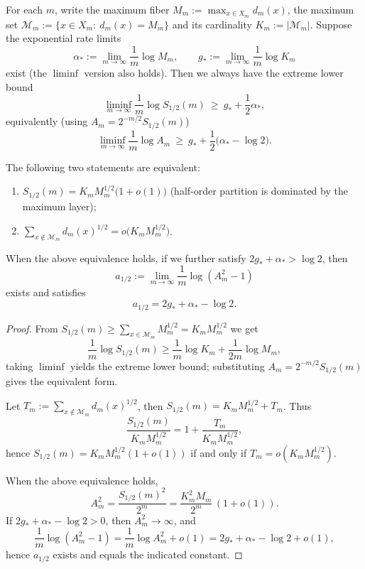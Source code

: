 \begin{theorem}\label{thm:pom-half-order-pressure-extreme-lower-bound-sqrt-freezing}
For each \(m\), write the maximum fiber \(M_m:=\max_{x\in X_m}d_m(x)\), the maximum set
\(
\mathcal{M}_m:=\{x\in X_m:\ d_m(x)=M_m\}
\)
and its cardinality \(K_m:=|\mathcal{M}_m|\).
Suppose the exponential rate limits
\[
\alpha_*:=\lim_{m\to\infty}\frac{1}{m}\log M_m,\qquad
g_*:=\lim_{m\to\infty}\frac{1}{m}\log K_m
\]
exist (the \(\liminf\) version also holds).
Then we always have the extreme lower bound
\[
\liminf_{m\to\infty}\frac{1}{m}\log S_{1/2}(m)\ \ge\ g_*+\frac{1}{2}\alpha_*,
\]
equivalently (using \(A_m=2^{-m/2}S_{1/2}(m)\))
\[
\liminf_{m\to\infty}\frac{1}{m}\log A_m\ \ge\ g_*+\frac{1}{2}\bigl(\alpha_*-\log 2\bigr).
\]
\par
The following two statements are equivalent:
\begin{enumerate}
  \item \(\displaystyle S_{1/2}(m)=K_m M_m^{1/2}\bigl(1+o(1)\bigr)\) (half-order partition is dominated by the maximum layer);
  \item \(\displaystyle \sum_{x\notin\mathcal{M}_m} d_m(x)^{1/2}=o\bigl(K_m M_m^{1/2}\bigr)\).
\end{enumerate}
When the above equivalence holds, if we further satisfy \(2g_*+\alpha_*>\log 2\), then
\[
a_{1/2}:=\lim_{m\to\infty}\frac{1}{m}\log(A_m^2-1)
\]
exists and satisfies
\[
a_{1/2}=2g_*+\alpha_*-\log 2.
\]
\end{theorem}
\begin{proof}
From \(S_{1/2}(m)\ge \sum_{x\in\mathcal{M}_m} M_m^{1/2}=K_m M_m^{1/2}\) we get
\[
\frac{1}{m}\log S_{1/2}(m)\ge \frac{1}{m}\log K_m+\frac{1}{2m}\log M_m,
\]
taking \(\liminf\) yields the extreme lower bound; substituting \(A_m=2^{-m/2}S_{1/2}(m)\) gives the equivalent form.
\par
Let
\(
T_m:=\sum_{x\notin\mathcal{M}_m} d_m(x)^{1/2}
\), then \(S_{1/2}(m)=K_m M_m^{1/2}+T_m\).
Thus
\[
\frac{S_{1/2}(m)}{K_m M_m^{1/2}}=1+\frac{T_m}{K_m M_m^{1/2}},
\]
hence \(S_{1/2}(m)=K_m M_m^{1/2}(1+o(1))\) if and only if \(T_m=o(K_m M_m^{1/2})\).
\par
When the above equivalence holds,
\[
A_m^2
=\frac{S_{1/2}(m)^2}{2^m}
=\frac{K_m^2 M_m}{2^m}\,(1+o(1)).
\]
If \(2g_*+\alpha_*-\log 2>0\), then \(A_m^2\to\infty\), and
\[
\frac{1}{m}\log(A_m^2-1)
=\frac{1}{m}\log A_m^2+o(1)
=2g_*+\alpha_*-\log 2+o(1),
\]
hence \(a_{1/2}\) exists and equals the indicated constant.
\end{proof}

